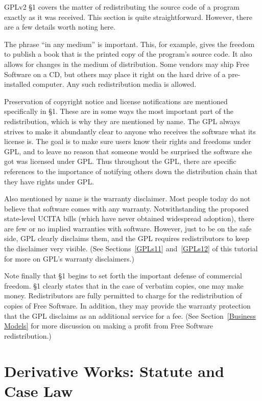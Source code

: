 GPLv2 \S 1 covers the matter of redistributing the source code of a program
exactly as it was received. This section is quite straightforward.
However, there are a few details worth noting here.

The phrase ``in any medium'' is important. This, for example, gives the
freedom to publish a book that is the printed copy of the program's source
code. It also allows for changes in the medium of distribution. Some
vendors may ship Free Software on a CD, but others may place it right on
the hard drive of a pre-installed computer. Any such redistribution media
is allowed.

Preservation of copyright notice and license notifications are mentioned
specifically in \S 1. These are in some ways the most important part of
the redistribution, which is why they are mentioned by name. The GPL
always strives to make it abundantly clear to anyone who receives the
software what its license is. The goal is to make sure users know their
rights and freedoms under GPL, and to leave no reason that someone would be
surprised the software she got was licensed under GPL\@. Thus
throughout the GPL, there are specific references to the importance of
notifying others down the distribution chain that they have rights under
GPL.

Also mentioned by name is the warranty disclaimer. Most people today do
not believe that software comes with any warranty. Notwithstanding the
proposed state-level UCITA bills (which have never obtained widespread
adoption), there are few or no implied warranties with software.
However, just to be on the safe side, GPL clearly disclaims them, and the
GPL requires redistributors to keep the disclaimer very visible. (See
Sections~\ref{GPLs11} and~\ref{GPLs12} of this tutorial for more on GPL's
warranty disclaimers.)

Note finally that \S 1 begins to set forth the important defense of
commercial freedom. \S 1 clearly states that in the case of verbatim
copies, one may make money. Redistributors are fully permitted to charge
for the redistribution of copies of Free Software. In addition, they may
provide the warranty protection that the GPL disclaims as an additional
service for a fee. (See Section~\ref{Business Models} for more discussion
on making a profit from Free Software redistribution.)


\chapter{Derivative Works: Statute and Case Law}

